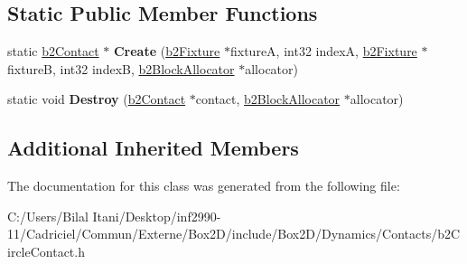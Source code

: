 \subsection*{Static Public Member Functions}
\begin{DoxyCompactItemize}
\item 
static \hyperlink{classb2_contact}{b2\+Contact} $\ast$ {\bfseries Create} (\hyperlink{classb2_fixture}{b2\+Fixture} $\ast$fixtureA, int32 indexA, \hyperlink{classb2_fixture}{b2\+Fixture} $\ast$fixtureB, int32 indexB, \hyperlink{classb2_block_allocator}{b2\+Block\+Allocator} $\ast$allocator)\hypertarget{classb2_circle_contact_a741c07fe3f626b80e01ff3d96cf2d90a}{}\label{classb2_circle_contact_a741c07fe3f626b80e01ff3d96cf2d90a}

\item 
static void {\bfseries Destroy} (\hyperlink{classb2_contact}{b2\+Contact} $\ast$contact, \hyperlink{classb2_block_allocator}{b2\+Block\+Allocator} $\ast$allocator)\hypertarget{classb2_circle_contact_a0171e991d568b7f4d8e5b4179072bf60}{}\label{classb2_circle_contact_a0171e991d568b7f4d8e5b4179072bf60}

\end{DoxyCompactItemize}
\subsection*{Additional Inherited Members}


The documentation for this class was generated from the following file\+:\begin{DoxyCompactItemize}
\item 
C\+:/\+Users/\+Bilal Itani/\+Desktop/inf2990-\/11/\+Cadriciel/\+Commun/\+Externe/\+Box2\+D/include/\+Box2\+D/\+Dynamics/\+Contacts/b2\+Circle\+Contact.\+h\end{DoxyCompactItemize}
